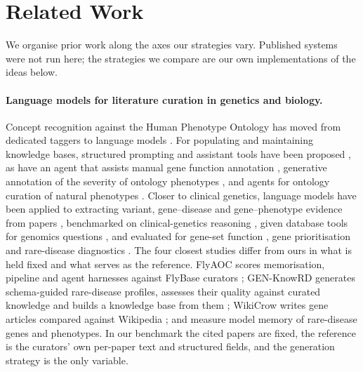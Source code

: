 \documentclass{article} %
\begin{document}
\section{Related Work}
\label{sec:related_work}
We organise prior work along the axes our strategies vary. Published systems were not run here; the strategies we compare are our own implementations of the ideas below.

\paragraph{Language models for literature curation in genetics and biology.}
Concept recognition against the Human Phenotype Ontology has moved from dedicated taggers \citep{luo2021phenotagger,groza2024fasthpocr} to language models \citep{groza2024evaluation,yang2024enhancing,garcia2025improving}. For populating and maintaining knowledge bases, structured prompting and assistant tools have been proposed \citep{caufield2024structured,caufield2024curategpt,toro2024dynamic,niyonkuru2025leveraging}, as have an agent that assists manual gene function annotation \citep{Li2025GenewhispererEnhancing}, generative annotation of the severity of ontology phenotypes \citep{Murphy2024HarnessingGenerative}, and agents for ontology curation of natural phenotypes \citep{balhoff2026frontier}. Closer to clinical genetics, language models have been applied to extracting variant, gene--disease and gene--phenotype evidence from papers \citep{li2025autopm3,furlan2025eagleai,wang2026pubmind,yin2026benchmarking}, benchmarked on clinical-genetics reasoning \citep{queen2025cgbench}, given database tools for genomics questions \citep{Jin2023GenegptAugmenting}, and evaluated for gene-set function \citep{hu2025evaluation}, gene prioritisation \citep{Kim2024AssessingUtility} and rare-disease diagnostics \citep{twede2026evidence}. The four closest studies differ from ours in what is held fixed and what serves as the reference. FlyAOC scores memorisation, pipeline and agent harnesses against FlyBase curators \citep{zhang2026flyaoc}; GEN-KnowRD generates schema-guided rare-disease profiles, assesses their quality against curated knowledge and builds a knowledge base from them \citep{yan2026genknowrd}; WikiCrow writes gene articles compared against Wikipedia \citep{skarlinski2024language}; and \citet{groza2026systematic} measure model memory of rare-disease genes and phenotypes. In our benchmark the cited papers are fixed, the reference is the curators' own per-paper text and structured fields, and the generation strategy is the only variable.
\end{document}
